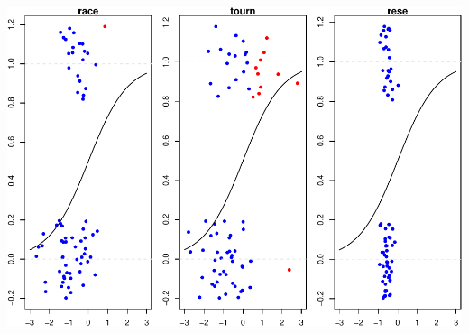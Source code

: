 \documentclass[]{article}
\begin{document}
\includegraphics{Figures/unnamed-chunk-11-1.pdf}
\end{document}
